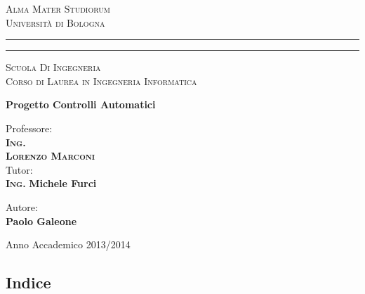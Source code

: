 \documentclass{article}
\begin{document}
\begin{titlepage}
\begin{center}
{{\Large{\textsc{Alma Mater Studiorum \\
Università di Bologna}}}} \rule[0.1cm]{15cm}{0.1mm}
\rule[0.5cm]{15cm}{0.6mm}
{\small{\textsc { Scuola Di Ingegneria \\
\vspace{5mm}
Corso di Laurea in Ingegneria Informatica }}}
\end{center}
\vspace{15mm}
\begin{center}
{\LARGE\textbf{Progetto Controlli Automatici}}\\
\end{center}
\vfill
\par
\noindent
\begin{minipage}[t]{0.47\textwidth}
{\large{\sc Professore:}\\
{\bf \textsc{Ing.\\
Lorenzo Marconi}}}\\
\vskip 8pt
{\large{\sc Tutor:}\\
{\bf \textsc{Ing.}}
{\bf Michele Furci}}
\end{minipage}
\hfill
\begin{minipage}[t]{0.47\textwidth}\raggedleft
{\large{\sc Autore:}\\
{\bf Paolo Galeone}}
\end{minipage}
\vspace{20mm}
\begin{center}
Anno Accademico 2013/2014
\end{center}
\end{titlepage}
\clearpage
    
\subsection*{Indice}
\end{document}
